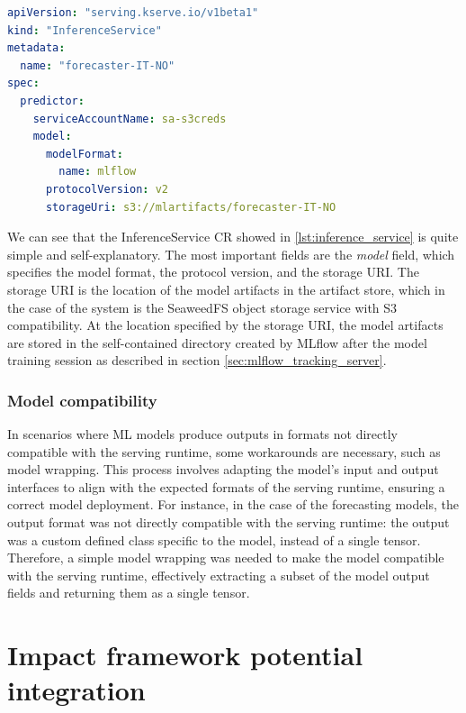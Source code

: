\begin{lstlisting}[language=yaml, caption={InferenceService Custom Resource example}, label={lst:inference_service}]
apiVersion: "serving.kserve.io/v1beta1"
kind: "InferenceService"
metadata:
  name: "forecaster-IT-NO"
spec:
  predictor:
    serviceAccountName: sa-s3creds
    model:
      modelFormat:
        name: mlflow
      protocolVersion: v2  
      storageUri: s3://mlartifacts/forecaster-IT-NO
\end{lstlisting}

We can see that the InferenceService CR showed in \ref{lst:inference_service} is quite simple and self-explanatory. 
The most important fields are the \textit{model} field, which specifies the model format, the protocol version, and the storage URI.
The storage URI is the location of the model artifacts in the artifact store, which in the case of the system is the SeaweedFS object storage service with S3 compatibility. 
At the location specified by the storage URI, the model artifacts are stored in the self-contained directory created by MLflow after the model training session as described in section \ref{sec:mlflow_tracking_server}.

\subsubsection{Model compatibility}

In scenarios where ML models produce outputs in formats not directly compatible with the serving runtime, some workarounds are necessary, such as model wrapping. This process involves adapting the model's input and output interfaces to align with the expected formats of the serving runtime, ensuring a correct model deployment.
For instance, in the case of the forecasting models, the output format was not directly compatible with the serving runtime: the output was a custom defined class specific to the model, instead of a single tensor. 
Therefore, a simple model wrapping was needed to make the model compatible with the serving runtime, effectively extracting a subset of the model output fields and returning them as a single tensor.

\section{Impact framework potential integration}
\label{sec:impact_framework_integration}

